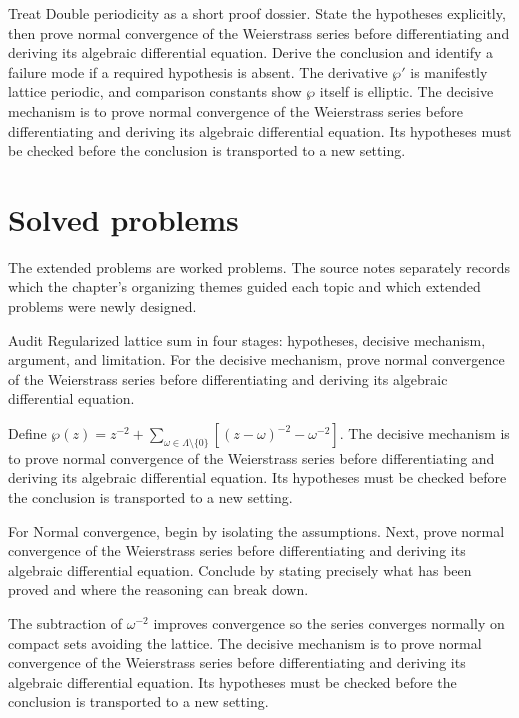 \begin{example}\label{ex:iv29-worked-04}
Treat Double periodicity as a short proof dossier. State the hypotheses explicitly, then prove normal convergence of the Weierstrass series before differentiating and deriving its algebraic differential equation. Derive the conclusion and identify a failure mode if a required hypothesis is absent. The derivative $\wp'$ is manifestly lattice periodic, and comparison constants show $\wp$ itself is elliptic. The decisive mechanism is to prove normal convergence of the Weierstrass series before differentiating and deriving its algebraic differential equation. Its hypotheses must be checked before the conclusion is transported to a new setting.
\end{example}

\section{Solved problems}
The extended problems are worked problems. The source notes separately records which the chapter's organizing themes guided each topic and which extended problems were newly designed.

\begin{problem}\label{prob:iv29-problem-01}
Audit Regularized lattice sum in four stages: hypotheses, decisive mechanism, argument, and limitation. For the decisive mechanism, prove normal convergence of the Weierstrass series before differentiating and deriving its algebraic differential equation.
\end{problem}
\begin{solution}
Define $\wp(z)=z^{-2}+\sum_{\omega\in\Lambda\setminus\{0\}}[(z-\omega)^{-2}-\omega^{-2}]$. The decisive mechanism is to prove normal convergence of the Weierstrass series before differentiating and deriving its algebraic differential equation. Its hypotheses must be checked before the conclusion is transported to a new setting.
\end{solution}

\begin{problem}\label{prob:iv29-problem-02}
For Normal convergence, begin by isolating the assumptions. Next, prove normal convergence of the Weierstrass series before differentiating and deriving its algebraic differential equation. Conclude by stating precisely what has been proved and where the reasoning can break down.
\end{problem}
\begin{solution}
The subtraction of $\omega^{-2}$ improves convergence so the series converges normally on compact sets avoiding the lattice. The decisive mechanism is to prove normal convergence of the Weierstrass series before differentiating and deriving its algebraic differential equation. Its hypotheses must be checked before the conclusion is transported to a new setting.
\end{solution}

